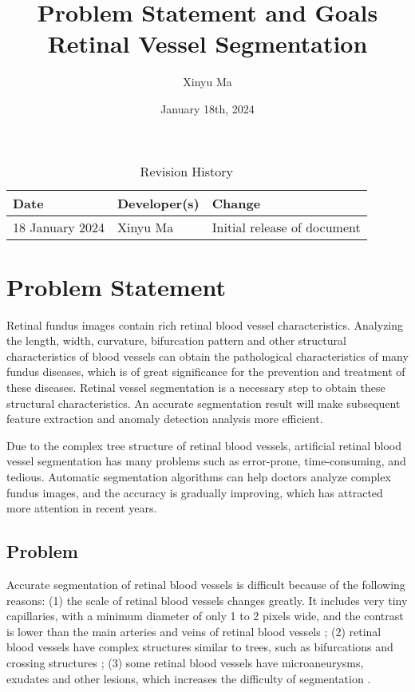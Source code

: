 \documentclass{article}
\title{Problem Statement and Goals\\Retinal Vessel Segmentation}
\author{Xinyu Ma}
\date{January 18th, 2024}
\begin{document}
\maketitle
\begin{table}[hp]
\caption{Revision History} \label{TblRevisionHistory}
\begin{tabularx}{\textwidth}{llX}
\toprule
\textbf{Date} & \textbf{Developer(s)} & \textbf{Change}\\
\midrule
18 January 2024 & \quad Xinyu Ma & Initial release of document\\

\bottomrule
\end{tabularx}
\end{table}

\section{Problem Statement}

Retinal fundus images contain rich retinal blood vessel characteristics. Analyzing the length, width, curvature, bifurcation pattern and other structural characteristics of blood vessels can obtain the pathological characteristics of many fundus diseases, which is of great significance for the prevention and treatment of these diseases. Retinal vessel segmentation is a necessary step to obtain these structural characteristics. An accurate segmentation result will make subsequent feature extraction and anomaly detection analysis more efficient.

Due to the complex tree structure of retinal blood vessels, artificial retinal blood vessel segmentation has many problems such as error-prone, time-consuming, and tedious. Automatic segmentation algorithms can help doctors analyze complex fundus images, and the accuracy is gradually improving, which has attracted more attention in recent years.

\subsection{Problem}

Accurate segmentation of retinal blood vessels is difficult because of the following reasons: (1) the scale of retinal blood vessels changes greatly. It includes very tiny capillaries, with a minimum diameter of only 1 to 2 pixels wide, and the contrast is lower than the main arteries and veins of retinal blood vessels \cite{wu2018multiscale}; (2) retinal blood vessels have complex structures similar to trees, such as bifurcations and crossing structures \cite{lian2019global}; (3) some retinal blood vessels have microaneurysms, exudates and other lesions, which increases the difficulty of segmentation \cite{lian2019global}.
\end{document}
